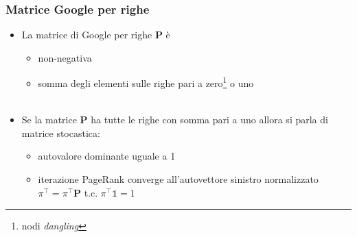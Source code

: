 \documentclass{beamer}
\begin{document}

\begin{frame}
	\frametitle{Matrice Google per righe}
	\begin{itemize}
		\item La matrice di Google per righe \textbf{P} è 
		\begin{itemize}
			\item non-negativa
			\item somma degli elementi sulle righe pari a zero\footnote{nodi \emph{dangling}} o uno \\~\\
		\end{itemize}
		\item Se la matrice \textbf{P} ha tutte le righe con somma pari a uno allora si parla di matrice stocastica:
		\begin{itemize}
			\item autovalore dominante uguale a 1
			\item iterazione PageRank converge all'autovettore sinistro normalizzato $\pi^\intercal=\pi^\intercal \textbf{P}$ t.c. $\pi^\intercal \mathbb{1} = 1$
		\end{itemize}
	\end{itemize}
\end{frame}

\end{document}
